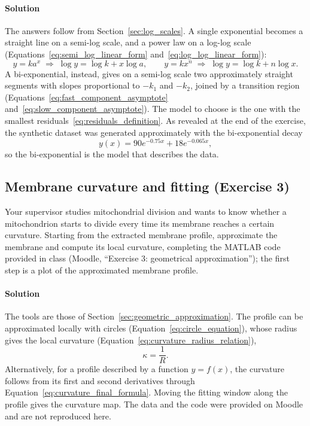 \paragraph{Solution} The answers follow from Section~\ref{sec:log_scales}. A single exponential becomes a straight line on a semi-log scale, and a power law on a log-log scale (Equations~\eqref{eq:semi_log_linear_form} and~\eqref{eq:log_log_linear_form}):
\begin{equation*}
y = ka^x \;\Rightarrow\; \log y = \log k + x\log a, \qquad y = kx^n \;\Rightarrow\; \log y = \log k + n\log x.
\end{equation*}
A bi-exponential, instead, gives on a semi-log scale two approximately straight segments with slopes proportional to $-k_1$ and $-k_2$, joined by a transition region (Equations~\eqref{eq:fast_component_asymptote} and~\eqref{eq:slow_component_asymptote}). The model to choose is the one with the smallest residuals~\eqref{eq:residuals_definition}. As revealed at the end of the exercise, the synthetic dataset was generated approximately with the bi-exponential decay
\begin{equation*}
y(x) = 90e^{-0.75x} + 18e^{-0.065x},
\end{equation*}
so the bi-exponential is the model that describes the data.

\subsection{Membrane curvature and fitting (Exercise 3)}
\label{ex:membrane_curvature}

Your supervisor studies mitochondrial division and wants to know whether a mitochondrion starts to divide every time its membrane reaches a certain curvature. Starting from the extracted membrane profile, approximate the membrane and compute its local curvature, completing the MATLAB code provided in class (Moodle, ``Exercise 3: geometrical approximation''); the first step is a plot of the approximated membrane profile.

\paragraph{Solution} The tools are those of Section~\ref{sec:geometric_approximation}. The profile can be approximated locally with circles (Equation~\eqref{eq:circle_equation}), whose radius gives the local curvature (Equation~\eqref{eq:curvature_radius_relation}),
\begin{equation*}
\kappa = \frac{1}{R}.
\end{equation*}
Alternatively, for a profile described by a function $y = f(x)$, the curvature follows from its first and second derivatives through Equation~\eqref{eq:curvature_final_formula}. Moving the fitting window along the profile gives the curvature map. The data and the code were provided on Moodle and are not reproduced here.

